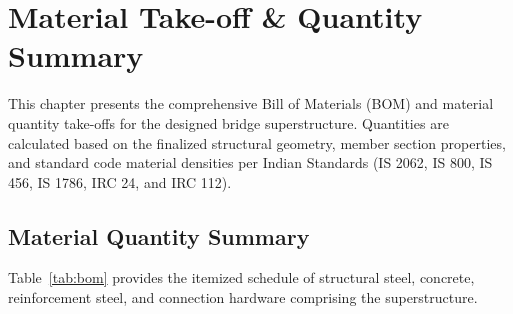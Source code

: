 \documentclass[12pt,a4paper]{report}
\numberwithin{table}{chapter}
\numberwithin{figure}{chapter}
\begin{document}
\chapter{Material Take-off \& Quantity Summary}
\label{ch:material-takeoff}

This chapter presents the comprehensive Bill of Materials (BOM) and material quantity
take-offs for the designed bridge superstructure. Quantities are calculated based on
the finalized structural geometry, member section properties, and standard code material
densities per Indian Standards (IS 2062, IS 800, IS 456, IS 1786, IRC 24, and IRC 112).

\section{Material Quantity Summary}
\label{sec:material-summary}

Table~\ref{tab:bom} provides the itemized schedule of structural steel, concrete,
reinforcement steel, and connection hardware comprising the superstructure.
\end{document}

